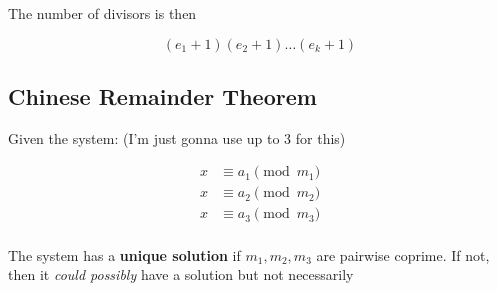 \documentclass[../../Main.tex]{subfiles}
\begin{document}
The number of divisors is then

$$(e_1 + 1)(e_2 + 1) \ldots (e_k + 1)$$

\subsection{Chinese Remainder Theorem}

Given the system: (I'm just gonna use up to 3 for this)

\begin{align*}
    x &\equiv a_1 \pmod{m_1} \\
    x &\equiv a_2 \pmod{m_2} \\
    x &\equiv a_3 \pmod{m_3} \\
\end{align*}

The system has a \textbf{unique solution} if $m_1, m_2, m_3$ are pairwise coprime. If not, then it \textit{could possibly} have a solution but not necessarily
\end{document}

